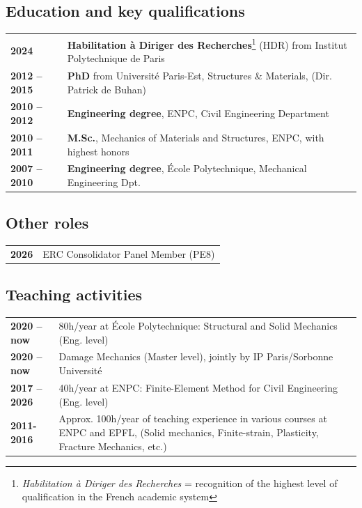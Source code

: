 \subsection*{\textcolor{navier_blue}{Education and key qualifications}}
\begin{table}[H]
{\renewcommand\tabcolsep{2pt}
\vspace{-0.3cm}
\begin{tabularx}{\textwidth}{p{2.3cm}X}
\textbf{2024} & \textbf{Habilitation à Diriger des Recherches}\footnote{\textit{Habilitation à Diriger des Recherches} = recognition of the highest level of qualification in the French academic system} (HDR) from Institut Polytechnique de Paris\\
\textbf{2012 -- 2015} & \textbf{PhD} from Université Paris-Est, Structures \& Materials, (Dir. Patrick de Buhan)\\
\textbf{2010 -- 2012}  & \textbf{Engineering degree}, ENPC, Civil Engineering Department \\ 
\textbf{2010 -- 2011} & \textbf{M.Sc.}, Mechanics of Materials and Structures, ENPC, with highest honors \\ 
\textbf{2007 -- 2010} & \textbf{Engineering degree}, \'Ecole Polytechnique, Mechanical Engineering Dpt.
\end{tabularx}}
\end{table}

\subsection*{\textcolor{navier_blue}{Other roles}}
\begin{table}[H]
{\renewcommand\tabcolsep{2pt}
\vspace{-0.3cm}
\begin{tabularx}{\textwidth}{p{2.3cm}X}
\textbf{2026}  & ERC Consolidator Panel Member (PE8)
\end{tabularx}}
\end{table}



\subsection*{\textcolor{navier_blue}{Teaching activities}}
\begin{table}[H]
{\renewcommand\tabcolsep{2pt}
\vspace{-0.3cm}
\begin{tabularx}{\textwidth}{p{2.3cm}X}
\textbf{2020 -- now}  & 80h/year at \'Ecole Polytechnique: Structural and Solid Mechanics (Eng. level)\\ 
\textbf{2020 -- now} & Damage Mechanics (Master level), jointly by IP Paris/Sorbonne Université\\
\textbf{2017 -- 2026} & 40h/year at ENPC: Finite-Element Method for Civil Engineering (Eng. level) \\ 
\textbf{2011-2016} & Approx. 100h/year of teaching experience in various courses at ENPC and EPFL, (Solid mechanics, Finite-strain, Plasticity, Fracture Mechanics, etc.)
\end{tabularx}}
\end{table}

